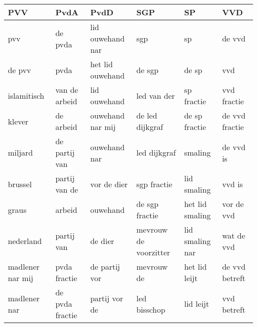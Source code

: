 \begin{tabular}{llllll}
\toprule
              PVV &             PvdA &              PvdD &                    SGP &               SP &             VVD \\
\midrule
              pvv &          de pvda &  lid ouwehand nar &                    sgp &               sp &          de vvd \\
           de pvv &             pvda &  het lid ouwehand &                 de sgp &            de sp &             vvd \\
      islamitisch &    van de arbeid &      lid ouwehand &            led van der &       sp fractie &     vvd fractie \\
           klever &        de arbeid &  ouwehand nar mij &        de led dijkgraf &    de sp fractie &  de vvd fractie \\
          miljard &    de partij van &      ouwehand nar &           led dijkgraf &          smaling &       de vvd is \\
          brussel &    partij van de &       vor de dier &            sgp fractie &      lid smaling &          vvd is \\
            graus &           arbeid &          ouwehand &         de sgp fractie &  het lid smaling &      vor de vvd \\
        nederland &       partij van &           de dier &  mevrouw de voorzitter &  lid smaling nar &      wat de vvd \\
 madlener nar mij &     pvda fractie &     de partij vor &             mevrouw de &    het lid leijt &  de vvd betreft \\
     madlener nar &  de pvda fractie &     partij vor de &           led bisschop &        lid leijt &     vvd betreft \\
\bottomrule
\end{tabular}
